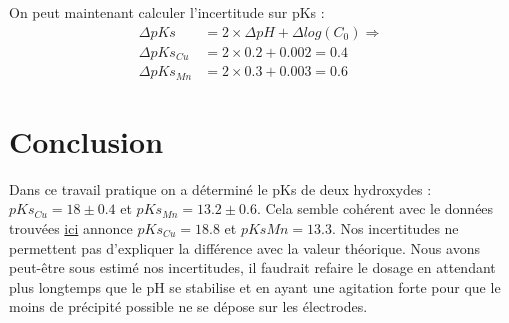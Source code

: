 \documentclass[12pt]{article}
\begin{document}
On peut maintenant calculer l'incertitude sur pKs :
\begin{align*}
\Delta pKs&= 2\times \Delta pH + \Delta log(C_0) \Longrightarrow\\
\Delta pKs_{Cu}&= 2 \times 0.2 + 0.002= 0.4 \\
\Delta pKs_{Mn}&= 2 \times 0.3 + 0.003 = 0.6
\end{align*}

\newpage
\section*{Conclusion}
Dans ce travail pratique on a déterminé le pKs de deux hydroxydes : $pKs_{Cu}=18\pm 0.4$ et $pKs_{Mn}=13.2\pm 0.6$. Cela semble cohérent avec le données trouvées \href{https://owl.oit.umass.edu/departments/Chemistry/appendix/ksp.html}{ici} annonce $pKs_{Cu}=18.8$ et $pKs{Mn}=13.3$.
 Nos incertitudes ne permettent pas d'expliquer la différence avec la valeur théorique. Nous avons peut-être sous estimé nos incertitudes, il faudrait refaire le dosage en attendant plus longtemps que le pH se stabilise et en ayant une agitation forte pour que le moins de précipité possible ne se dépose sur les électrodes. 
\end{document}
